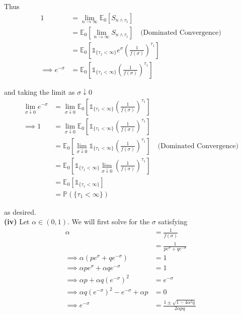 \documentclass[12pt]{article}
\renewcommand{\P}{\mathbb P}
\newcommand{\E}{\mathbb E}
\begin{document}
Thus
\begin{align*}
	1 &= \lim_{n\to\infty} \E_0 \left[ S_{n\land\tau_1} \right] \\
	&= \E_0 \left[ \lim_{n\to\infty} S_{n\land\tau_1} \right] \quad \text{(Dominated Convergence)} \\
	&= \E_0 \left[ \mathds 1_{\{ \tau_1 < \infty \}} e^\sigma \left( \frac{1}{f(\sigma)} \right)^{\tau_1} \right]  \\
	\implies e^{-\sigma} &= \E_0 \left[ \mathds 1_{\{ \tau_1 < \infty \}} \left( \frac{1}{f(\sigma)} \right)^{\tau_1} \right] 
\end{align*}

and taking the limit as $\sigma \downarrow 0$
\begin{align*}
	\lim_{\sigma\downarrow 0} e^{-\sigma} &= \lim_{\sigma\downarrow 0} \E_0 \left[ \mathds 1_{\{ \tau_1 < \infty \}} \left( \frac{1}{f(\sigma)} \right)^{\tau_1} \right] \\
	\implies 1 &= \lim_{\sigma \downarrow 0} \E_0 \left[ \mathds 1_{\{ \tau_1 < \infty \}} \left( \frac{1}{f(\sigma)} \right)^{\tau_1} \right] \\
	&= \E_0 \left[ \lim_{\sigma\downarrow 0} \mathds 1_{\{ \tau_1 < \infty \}} \left( \frac{1}{f(\sigma)} \right)^{\tau_1} \right] \quad \text{(Dominated Convergence)} \\
	&= \E_0 \left[ \mathds 1_{\{\tau_1 < \infty\}} \lim_{\sigma \downarrow 0} \left( \frac{1}{f(\sigma)} \right)^{\tau_1} \right] \\
	&= \E_0 \left[ \mathds 1_{\{\tau_1 < \infty \}} \right] \\
	&= \P \left( \{\tau_1 < \infty\} \right)
\end{align*}

as desired. \\

{\bf (iv)} Let $\alpha \in (0,1)$. We will first solve for the $\sigma$ satisfying
\begin{align*}
	\alpha &= \frac{1}{f(\sigma)} \\
	&= \frac{1}{ pe^{\sigma} + qe^{-\sigma} } \\
	\implies \alpha \left( pe^\sigma + qe^{-\sigma} \right) &= 1 \\
	\implies \alpha p e^\sigma + \alpha q e^{-\sigma} &= 1 \\
	\implies \alpha p + \alpha q\left( e^{-\sigma} \right)^2 &= e^{-\sigma} \\
	\implies \alpha q \left( e^{-\sigma} \right)^2 - e^{-\sigma} + \alpha p &= 0 \\ 
	\implies e^{-\sigma} &= \frac{ 1 \pm \sqrt{1 - 4\alpha^2 q }}{ 2\alpha pq } 
\end{align*}
\end{document}
